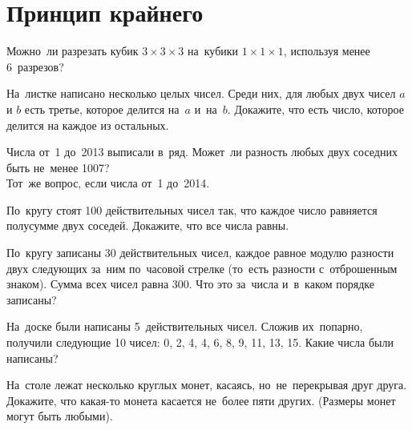 

\section*{Принцип крайнего}


\begin{problems}

\item
Можно~ли разрезать кубик $3 \times 3 \times 3$ на~кубики $1 \times 1 \times 1$,
используя менее 6~разрезов?

\item
На~листке написано несколько целых чисел.
Среди них, для любых двух чисел $a$ и $b$ есть третье, которое делится на~$a$ и~на~$b$.
Докажите, что есть число, которое делится на каждое из остальных.

\item
\sbp
Числа от~1 до~2013 выписали в~ряд.
Может~ли разность любых двух соседних быть не~менее 1007?
\\
\sbp
Тот~же вопрос, если числа от~1 до~2014.

\item
По~кругу стоят 100 действительных чисел так, что каждое число равняется
полусумме двух соседей.
Докажите, что все числа равны.

\item
По~кругу записаны 30 действительных чисел, каждое равное модулю разности двух
следующих за~ним по~часовой стрелке (то~есть разности с~отброшенным знаком).
Сумма всех чисел равна 300.
Что это за~числа и~в~каком порядке записаны?

\item
На~доске были написаны 5~действительных чисел.
Сложив их~попарно, получили следующие 10 чисел:
0, 2, 4, 4, 6, 8, 9, 11, 13, 15.
Какие числа были написаны?

\item
На~столе лежат несколько круглых монет, касаясь, но~не~перекрывая друг друга.
Докажите, что какая-то монета касается не~более пяти других.
(Размеры монет могут быть любыми).

\end{problems}

